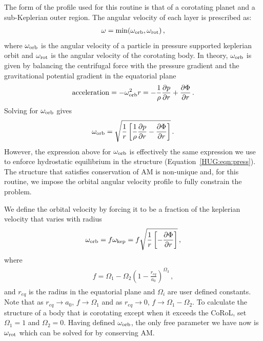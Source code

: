 \documentclass[11pt, oneside]{article}   	%
\begin{document}
The form of the profile used for this routine is that of a corotating planet and a sub-Keplerian outer region.
The angular velocity of each layer is prescribed as:
%
\begin{align}
\begin{aligned}
\omega=\min(\omega_{\rm orb}, \omega_{\rm rot}) \,,
\end{aligned}
\end{align}
%
where $\omega_{\rm orb}$ is the angular velocity of a particle in pressure supported keplerian orbit and $\omega_{\rm rot}$ is the angular velocity of the corotating body. 
In theory, $\omega_{\rm orb}$ is given by balancing the centrifugal force with the pressure gradient and the gravitational potential gradient in the equatorial plane
%
\begin{align}
\begin{aligned}
\mathrm{acceleration}=-\omega_{\rm orb}^2 r = -\frac{1}{\rho} \frac{\partial p}{\partial r} + \frac{\partial \Phi}{\partial r} \, .
\end{aligned}
\end{align}
%
Solving for $\omega_{\rm orb}$ gives
%
\begin{align}
\begin{aligned}
\omega_{\rm orb} = \sqrt{\frac{1}{r} \left [ \frac{1}{\rho} \frac{\partial p}{\partial r} - \frac{\partial \Phi}{\partial r} \right ] } \,.
\end{aligned}
\end{align}
%
However, the expression above for $\omega_{\rm orb}$ is effectively the same expression we use to enforce hydrostatic equilibrium in the structure (Equation~\ref{HUG:eqn:press}). 
The structure that satisfies conservation of AM is non-unique and, for this routine, we impose the orbital angular velocity profile to fully constrain the problem.


We define the orbital velocity by forcing it to be a fraction of the keplerian velocity that varies with radius
%
\begin{align}
\begin{aligned}
\omega_{\rm orb}=f \omega_{\rm kep} = f \sqrt{\frac{1}{r} \left [  - \frac{\partial \Phi}{\partial r} \right ] } \,,
\end{aligned}
\end{align}
%
where 
%
\begin{align}
\begin{aligned}
f = \Omega_1- \Omega_2 \left (1 - \frac{r_{eq}}{a_0} \right ) ^{\Omega_3} \,,
\end{aligned}
\end{align}
%
and $r_{eq}$ is the radius in the equatorial plane and $\Omega_i$ are user defined constants. 
Note that as $r_{eq} \rightarrow a_0$, $f\rightarrow \Omega_1$ and as $r_{eq} \rightarrow 0$, $f\rightarrow \Omega_1- \Omega_2$.
To calculate the structure of a body that is corotating except when it exceeds the CoRoL, set $\Omega_1=1$ and $\Omega_{2}=0$.
Having defined $\omega_{\rm orb}$, the only free parameter we have now is $\omega_{\rm rot}$ which can be solved for by conserving AM.
\end{document}
